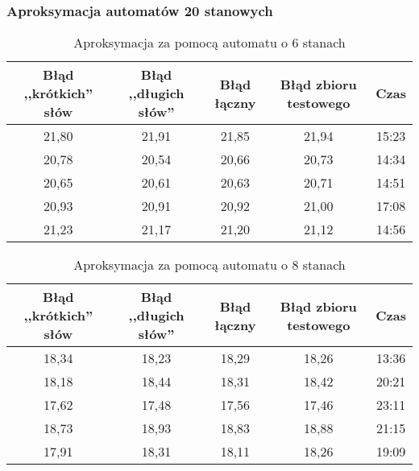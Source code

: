 \documentclass{../llncs_template_final/llncs}
\begin{document}
\subsubsection{Aproksymacja automatów 20 stanowych} 

\begin{table}[] 
\centering 
\caption{Aproksymacja za pomocą automatu o 6 stanach}  
\begin{tabular}{| c | c | c | c | c |} 
\hline Błąd ,,krótkich'' słów & Błąd ,,długich słów'' & Błąd łączny & Błąd zbioru testowego & Czas \\ [0.5ex] 
\hline 21,80 & 21,91 & 21,85 & 21,94 & 15:23 \\ 
\hline 20,78 & 20,54 & 20,66 & 20,73 & 14:34 \\ 
\hline 20,65 & 20,61 & 20,63 & 20,71 & 14:51 \\ 
\hline 20,93 & 20,91 & 20,92 & 21,00 & 17:08 \\ 
\hline 21,23 & 21,17 & 21,20 & 21,12 & 14:56 \\ 
\hline 
\end{tabular} 
\end{table} 

\begin{table}[] 
\centering 
\caption{Aproksymacja za pomocą automatu o 8 stanach} 
\begin{tabular}{| c | c | c | c | c |} 
\hline Błąd ,,krótkich'' słów & Błąd ,,długich słów'' & Błąd łączny & Błąd zbioru testowego & Czas \\ [0.5ex] 
\hline 18,34 & 18,23 & 18,29 & 18,26 & 13:36 \\ 
\hline 18,18 & 18,44 & 18,31 & 18,42 & 20:21 \\ 
\hline 17,62 & 17,48 & 17,56 & 17,46 & 23:11 \\ 
\hline 18,73 & 18,93 & 18,83 & 18,88 & 21:15 \\ 
\hline 17,91 & 18,31 & 18,11 & 18,26 & 19:09 \\ 
\hline 
\end{tabular} 
\end{table}
\end{document}
